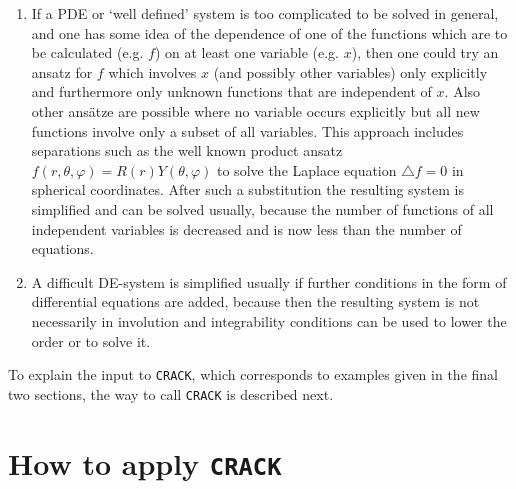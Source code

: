 \begin{enumerate}
\item
  If a PDE or `well defined' system is too complicated to be solved in
  general, and one has some idea of the dependence of one of the
  functions which are to be calculated (e.g. $f$) on at least one
  variable (e.g. $x$), then one could try an ansatz for $f$ which
  involves $x$ (and possibly other variables) 
  only explicitly and furthermore only unknown functions 
  that are independent of $x$. Also other
  ans\"atze are possible where no variable occurs explicitly but all new
  functions involve only a subset of all variables. This approach
  includes separations such as the well known product ansatz $f(r,
  \theta, \varphi) = R(r)Y(\theta, \varphi)$ to solve the Laplace
  equation $\triangle f = 0$ in spherical coordinates. After such a
  substitution the resulting system is simplified and can be solved
  usually, because the
  number of functions of all independent variables is decreased and is
  now less than the number of equations.
   
\item
  A difficult DE-system is simplified usually if further conditions
  in the form of differential equations are added,
  because then the resulting system is not necessarily in involution
  and integrability conditions can be used to lower the order or to
  solve it.
\end{enumerate}

To explain the input to {\tt CRACK}, which corresponds to examples
given in the final two sections, the way to call {\tt CRACK} is described next.

\section{How to apply {\tt CRACK}}  
